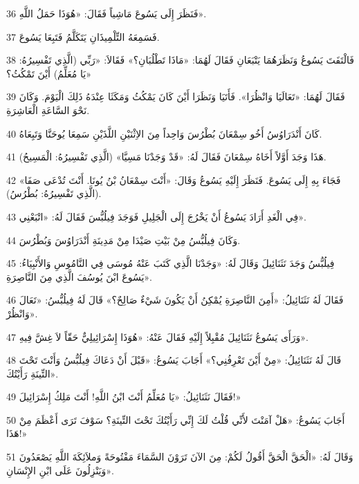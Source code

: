 \par 36 فَنَظَرَ إِلَى يَسُوعَ مَاشِياً فَقَالَ: «هُوَذَا حَمَلُ اللَّهِ».
\par 37 فَسَمِعَهُ التِّلْمِيذَانِ يَتَكَلَّمُ فَتَبِعَا يَسُوعَ.
\par 38 فَالْتَفَتَ يَسُوعُ وَنَظَرَهُمَا يَتْبَعَانِ فَقَالَ لَهُمَا: «مَاذَا تَطْلُبَانِ؟» فَقَالاَ: «رَبِّي (الَّذِي تَفْسِيرُهُ: يَا مُعَلِّمُ) أَيْنَ تَمْكُثُ؟»
\par 39 فَقَالَ لَهُمَا: «تَعَالَيَا وَانْظُرَا». فَأَتَيَا وَنَظَرَا أَيْنَ كَانَ يَمْكُثُ وَمَكَثَا عِنْدَهُ ذَلِكَ الْيَوْمَ. وَكَانَ نَحْوَ السَّاعَةِ الْعَاشِرَةِ.
\par 40 كَانَ أَنْدَرَاوُسُ أَخُو سِمْعَانَ بُطْرُسَ وَاحِداً مِنَ الاِثْنَيْنِ اللَّذَيْنِ سَمِعَا يُوحَنَّا وَتَبِعَاهُ.
\par 41 هَذَا وَجَدَ أَوَّلاً أَخَاهُ سِمْعَانَ فَقَالَ لَهُ: «قَدْ وَجَدْنَا مَسِيَّا» (الَّذِي تَفْسِيرُهُ: الْمَسِيحُ).
\par 42 فَجَاءَ بِهِ إِلَى يَسُوعَ. فَنَظَرَ إِلَيْهِ يَسُوعُ وَقَالَ: «أَنْتَ سِمْعَانُ بْنُ يُونَا. أَنْتَ تُدْعَى صَفَا» (الَّذِي تَفْسِيرُهُ: بُطْرُسُ).
\par 43 فِي الْغَدِ أَرَادَ يَسُوعُ أَنْ يَخْرُجَ إِلَى الْجَلِيلِ فَوَجَدَ فِيلُبُّسَ فَقَالَ لَهُ: «اتْبَعْنِي».
\par 44 وَكَانَ فِيلُبُّسُ مِنْ بَيْتِ صَيْدَا مِنْ مَدِينَةِ أَنْدَرَاوُسَ وَبُطْرُسَ.
\par 45 فِيلُبُّسُ وَجَدَ نَثَنَائِيلَ وَقَالَ لَهُ: «وَجَدْنَا الَّذِي كَتَبَ عَنْهُ مُوسَى فِي النَّامُوسِ وَالأَنْبِيَاءُ: يَسُوعَ ابْنَ يُوسُفَ الَّذِي مِنَ النَّاصِرَةِ».
\par 46 فَقَالَ لَهُ نَثَنَائِيلُ: «أَمِنَ النَّاصِرَةِ يُمْكِنُ أَنْ يَكُونَ شَيْءٌ صَالِحٌ؟» قَالَ لَهُ فِيلُبُّسُ: «تَعَالَ وَانْظُرْ».
\par 47 وَرَأَى يَسُوعُ نَثَنَائِيلَ مُقْبِلاً إِلَيْهِ فَقَالَ عَنْهُ: «هُوَذَا إِسْرَائِيلِيٌّ حَقّاً لاَ غِشَّ فِيهِ».
\par 48 قَالَ لَهُ نَثَنَائِيلُ: «مِنْ أَيْنَ تَعْرِفُنِي؟» أَجَابَ يَسُوعُ: «قَبْلَ أَنْ دَعَاكَ فِيلُبُّسُ وَأَنْتَ تَحْتَ التِّينَةِ رَأَيْتُكَ».
\par 49 فَقَالَ نَثَنَائِيلُ: «يَا مُعَلِّمُ أَنْتَ ابْنُ اللَّهِ! أَنْتَ مَلِكُ إِسْرَائِيلَ!»
\par 50 أَجَابَ يَسُوعُ: «هَلْ آمَنْتَ لأَنِّي قُلْتُ لَكَ إِنِّي رَأَيْتُكَ تَحْتَ التِّينَةِ؟ سَوْفَ تَرَى أَعْظَمَ مِنْ هَذَا!»
\par 51 وَقَالَ لَهُ: «الْحَقَّ الْحَقَّ أَقُولُ لَكُمْ: مِنَ الآنَ تَرَوْنَ السَّمَاءَ مَفْتُوحَةً وَملاَئِكَةَ اللَّهِ يَصْعَدُونَ وَيَنْزِلُونَ عَلَى ابْنِ الإِنْسَانِ».


